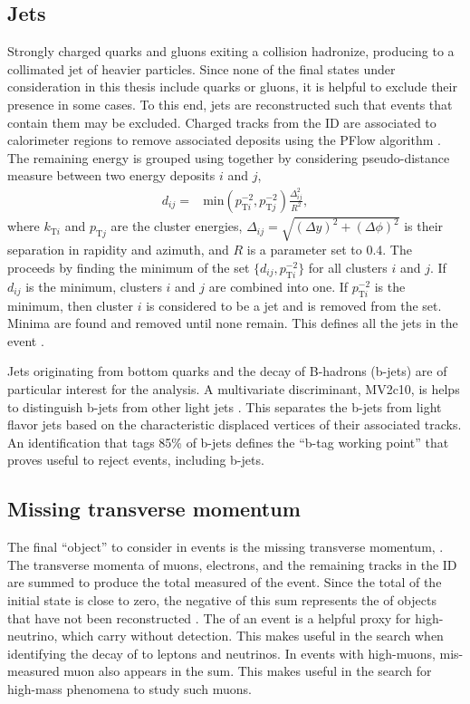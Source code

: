 \subsection{Jets}\label{sec:expJets}

Strongly charged quarks and gluons exiting a collision hadronize, producing to a collimated jet of heavier particles.
Since none of the final states under consideration in this thesis include quarks or gluons, it is helpful to exclude their presence in some cases.
To this end, jets are reconstructed such that events that contain them may be excluded.
Charged tracks from the ID are associated to calorimeter regions to remove associated deposits using the PFlow algorithm \cite{jetReco}.
The remaining energy is grouped using together by considering pseudo-distance measure between two energy deposits $i$ and $j$,
\begin{equation}\begin{split}
d_{ij} =& \text{min}(p^{-2}_{\text{T}i},p^{-2}_{\text{T}j})\frac{\Delta_{ij}^2}{R^2},
\end{split}\end{equation} 
where $k_{\text{T}i}$ and $p_{\text{T}j}$ are the cluster energies, $\Delta_{ij}=\sqrt{(\Delta y)^2+(\Delta\phi)^2}$ is their separation in rapidity and azimuth, and $R$ is a parameter set to 0.4.
The proceeds by finding the minimum of the set $\{d_{ij},p^{-2}_{\text{T}i}\}$ for all clusters $i$ and $j$. 
If $d_{ij}$ is the minimum, clusters $i$ and $j$ are combined into one.
If $p^{-2}_{\text{T}i}$ is the minimum, then cluster $i$ is considered to be a jet and is removed from the set.
Minima are found and removed until none remain.
This defines all the jets in the event \cite{antikt}.

Jets originating from bottom quarks and the decay of B-hadrons (b-jets) are of particular interest for the \hmm analysis.
A multivariate discriminant, MV2c10, is helps to distinguish b-jets from other light jets \cite{btag}.
This separates the b-jets from light flavor jets based on the characteristic displaced vertices of their associated tracks.
An identification that tags 85\% of b-jets defines the ``b-tag working point'' that proves useful to reject events, including b-jets.

\subsection{Missing transverse momentum}

The final ``object'' to consider in events is the missing transverse momentum, \met.
The transverse momenta of muons, electrons, and the remaining tracks in the ID are summed to produce the total measured \pt of the event.
Since the total \pt of the initial state is close to zero, the negative of this \pt sum represents the \pt of objects that have not been reconstructed \cite{met}.
The \met of an event is a helpful proxy for high-\pt neutrino, which carry \pt without detection.
This makes \met useful in the \hmm search when identifying the decay of \W to leptons and neutrinos.
In events with high-\pt muons, mis-measured muon \pt also appears in the \met sum.
This makes \met useful in the search for high-mass phenomena to study such muons.

